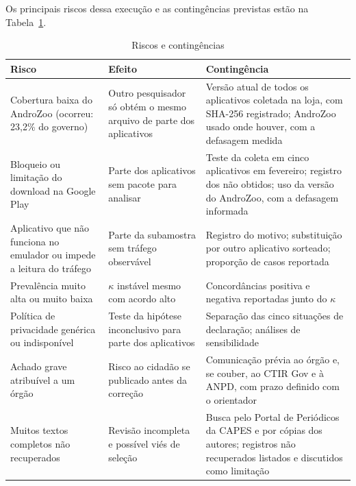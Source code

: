 Os principais riscos dessa execução e as contingências previstas estão na Tabela~\ref{tab:riscos}.

\begin{table}[htbp]
\centering
\small
\caption{Riscos e contingências}\label{tab:riscos}
\begin{tabularx}{\textwidth}{|>{\raggedright\arraybackslash}X|>{\raggedright\arraybackslash}X|>{\raggedright\arraybackslash}X|}
\hline
\textbf{Risco} & \textbf{Efeito} & \textbf{Contingência} \\
\hline
Cobertura baixa do AndroZoo (ocorreu: 23,2\% do governo) & Outro pesquisador só obtém o mesmo arquivo de parte dos aplicativos & Versão atual de todos os aplicativos coletada na loja, com SHA-256 registrado; AndroZoo usado onde houver, com a defasagem medida \\ \hline
Bloqueio ou limitação do download na Google Play & Parte dos aplicativos sem pacote para analisar & Teste da coleta em cinco aplicativos em fevereiro; registro dos não obtidos; uso da versão do AndroZoo, com a defasagem informada \\ \hline
Aplicativo que não funciona no emulador ou impede a leitura do tráfego & Parte da subamostra sem tráfego observável & Registro do motivo; substituição por outro aplicativo sorteado; proporção de casos reportada \\ \hline
Prevalência muito alta ou muito baixa & $\kappa$ instável mesmo com acordo alto & Concordâncias positiva e negativa reportadas junto do $\kappa$ \\ \hline
Política de privacidade genérica ou indisponível & Teste da hipótese inconclusivo para parte dos aplicativos & Separação das cinco situações de declaração; análises de sensibilidade \\ \hline
Achado grave atribuível a um órgão & Risco ao cidadão se publicado antes da correção & Comunicação prévia ao órgão e, se couber, ao CTIR Gov e à ANPD, com prazo definido com o orientador \\ \hline
Muitos textos completos não recuperados & Revisão incompleta e possível viés de seleção & Busca pelo Portal de Periódicos da CAPES e por cópias dos autores; registros não recuperados listados e discutidos como limitação \\ \hline
\end{tabularx}
\end{table}
